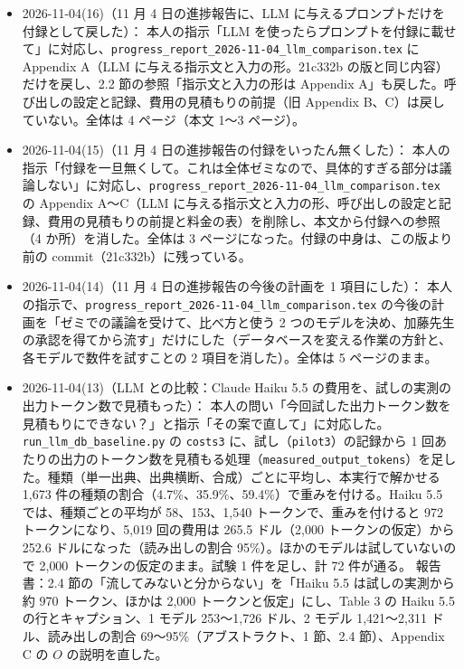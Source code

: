 \documentclass[11pt,a4paper]{jsarticle}
\begin{document}
\begin{itemize}[nosep]
  \item 2026-11-04(16)（11 月 4 日の進捗報告に、LLM に与えるプロンプトだけを付録として戻した）：
    本人の指示「LLM を使ったらプロンプトを付録に載せて」に対応し、\texttt{progress\_report\_2026-11-04\_llm\_comparison.tex} に Appendix A（LLM に与える指示文と入力の形。21c332b の版と同じ内容）だけを戻し、2.2 節の参照「指示文と入力の形は Appendix A」も戻した。呼び出しの設定と記録、費用の見積もりの前提（旧 Appendix B、C）は戻していない。全体は 4 ページ（本文 1〜3 ページ）。
  \item 2026-11-04(15)（11 月 4 日の進捗報告の付録をいったん無くした）：
    本人の指示「付録を一旦無くして。これは全体ゼミなので、具体的すぎる部分は議論しない」に対応し、\texttt{progress\_report\_2026-11-04\_llm\_comparison.tex} の Appendix A〜C（LLM に与える指示文と入力の形、呼び出しの設定と記録、費用の見積もりの前提と料金の表）を削除し、本文から付録への参照（4 か所）を消した。全体は 3 ページになった。付録の中身は、この版より前の commit（21c332b）に残っている。
  \item 2026-11-04(14)（11 月 4 日の進捗報告の今後の計画を 1 項目にした）：
    本人の指示で、\texttt{progress\_report\_2026-11-04\_llm\_comparison.tex} の今後の計画を「ゼミでの議論を受けて、比べ方と使う 2 つのモデルを決め、加藤先生の承認を得てから流す」だけにした（データベースを変える作業の方針と、各モデルで数件を試すことの 2 項目を消した）。全体は 5 ページのまま。
  \item 2026-11-04(13)（LLM との比較：Claude Haiku 5.5 の費用を、試しの実測の出力トークン数で見積もった）：
    本人の問い「今回試した出力トークン数を見積もりにできない？」と指示「その案で直して」に対応した。\texttt{run\_llm\_db\_baseline.py} の \texttt{costs3} に、試し（\texttt{pilot3}）の記録から 1 回あたりの出力のトークン数を見積もる処理（\texttt{measured\_output\_tokens}）を足した。種類（単一出典、出典横断、合成）ごとに平均し、本実行で解かせる 1{,}673 件の種類の割合（4.7\%、35.9\%、59.4\%）で重みを付ける。Haiku 5.5 では、種類ごとの平均が 58、153、1{,}540 トークンで、重みを付けると 972 トークンになり、5{,}019 回の費用は 265.5 ドル（2{,}000 トークンの仮定）から 252.6 ドルになった（読み出しの割合 95\%）。ほかのモデルは試していないので 2{,}000 トークンの仮定のまま。試験 1 件を足し、計 72 件が通る。
    報告書：2.4 節の「流してみないと分からない」を「Haiku 5.5 は試しの実測から約 970 トークン、ほかは 2{,}000 トークンと仮定」にし、Table 3 の Haiku 5.5 の行とキャプション、1 モデル 253〜1{,}726 ドル、2 モデル 1{,}421〜2{,}311 ドル、読み出しの割合 69〜95\%（アブストラクト、1 節、2.4 節）、Appendix C の $O$ の説明を直した。

\end{itemize}
\end{document}
